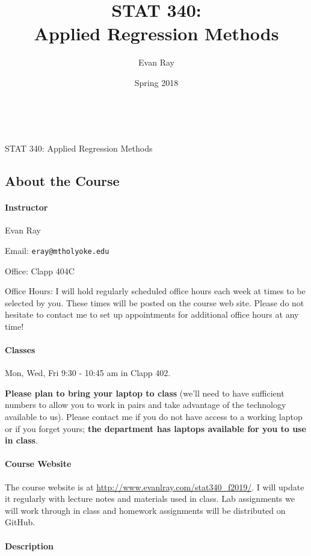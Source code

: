 \documentclass[11pt]{article}
\title{STAT 340:\\Applied Regression Methods}
\author{Evan Ray}
\date{Spring 2018}
\begin{document}

\ \\
\vspace{.01in}
\begin{center}
{\large STAT 340: Applied Regression Methods}
\end{center}
\subsection*{About the Course}

\paragraph{Instructor}

Evan Ray

Email: \texttt{eray@mtholyoke.edu}

Office: Clapp 404C

Office Hours: I will hold regularly scheduled office hours each week at times to be selected by you.  These times will be posted on the course web site.  Please do not hesitate to contact me to set up appointments for additional office hours at any time!

\paragraph{Classes} \mbox{}

Mon, Wed, Fri 9:30 - 10:45 am in Clapp 402.

\textbf{Please plan to bring your laptop to class} (we'll need to have sufficient numbers to allow you to work in pairs and take advantage of the technology available to us).  Please contact me if you do not have access to a working laptop or if you forget yours; \textbf{the department has laptops available for you to use in class}.

\paragraph{Course Website}
The course website is at \url{http://www.evanlray.com/stat340_f2019/}.  I will update it regularly with lecture notes and materials used in class.  Lab assignments we will work through in class and homework assignments will be distributed on GitHub.

\paragraph{Description}
\end{document}
